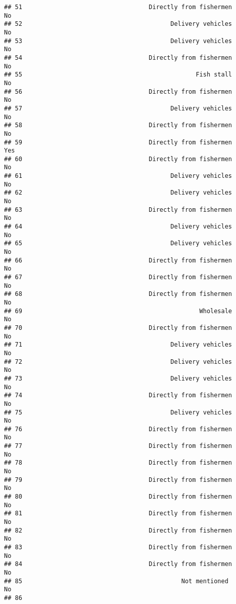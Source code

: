 \documentclass[
]{article}
\begin{document}
\begin{verbatim}
## 51                                   Directly from fishermen        No
## 52                                         Delivery vehicles        No
## 53                                         Delivery vehicles        No
## 54                                   Directly from fishermen        No
## 55                                                Fish stall        No
## 56                                   Directly from fishermen        No
## 57                                         Delivery vehicles        No
## 58                                   Directly from fishermen        No
## 59                                   Directly from fishermen       Yes
## 60                                   Directly from fishermen        No
## 61                                         Delivery vehicles        No
## 62                                         Delivery vehicles        No
## 63                                   Directly from fishermen        No
## 64                                         Delivery vehicles        No
## 65                                         Delivery vehicles        No
## 66                                   Directly from fishermen        No
## 67                                   Directly from fishermen        No
## 68                                   Directly from fishermen        No
## 69                                                 Wholesale        No
## 70                                   Directly from fishermen        No
## 71                                         Delivery vehicles        No
## 72                                         Delivery vehicles        No
## 73                                         Delivery vehicles        No
## 74                                   Directly from fishermen        No
## 75                                         Delivery vehicles        No
## 76                                   Directly from fishermen        No
## 77                                   Directly from fishermen        No
## 78                                   Directly from fishermen        No
## 79                                   Directly from fishermen        No
## 80                                   Directly from fishermen        No
## 81                                   Directly from fishermen        No
## 82                                   Directly from fishermen        No
## 83                                   Directly from fishermen        No
## 84                                   Directly from fishermen        No
## 85                                            Not mentioned         No
## 86                                                                    

\end{verbatim}
\end{document}
